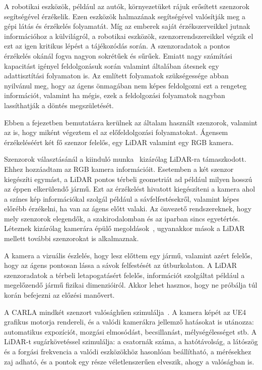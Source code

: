 \documentclass[a4paper,12pt,oneside]{article}
\begin{document}
A robotikai eszközök, például az autók, környezetüket rájuk erősített szenzorok segítségével érzékelik.
Ezen eszközök halmazának segítségével valósítják meg a gépi látás és érzékelés folyamatát. 
Míg az emberek saját 
érzékszerveikkel jutnak információhoz a külvilágról, a robotikai eszközök, 
szenzorrendszereikkel végzik el
ezt az igen kritikus lépést a tájékozódás során. A szenzoradatok a pontos 
érzékelés okánál fogva nagyon sokrétűek 
és sűrűek. Emiatt nagy számítási kapacitást igényel feldolgozásuk során valamint
általában átesnek egy adattisztítási
folyamaton is. Az említett folyamatok szükségessége abban nyilvánul meg, hogy az ágens 
önmagában nem képes feldolgozni ezt a 
rengeteg információt, valamint ha mégis, ezek a feldolgozási folyamatok nagyban 
lassíthatják a döntés megszületését.

Ebben a fejezetben bemutatásra kerülnek az általam használt szenzorok, valamint az is, hogy miként végeztem el az előfeldolgozási
folyamatokat. Ágensem érzékeléséért két fő szenzor felelős, egy LiDAR valamint egy RGB kamera. 

Szenzorok választásánál a kiinduló munka~\cite{terapaptommakol2022obstacle} kizárólag LiDAR-ra támaszkodott.
Ehhez hozzáadtam az RGB kamera információit. Esetemben a két szenzor kiegészíti egymást, a LiDAR pontos
térbeli geometriát ad például milyen hosszú az éppen elkerülendő jármű. 
Ezt az érzékelést hivatott kiegészíteni a kamera ahol a színes kép információkal szolgál például a 
sávfelfestésekről, valamint képes előrébb érzékelni, ha van az ágens előtt valaki.
Az önvezető rendszereknek, hogy mely szenzorok elegendők, a szakirodalomban és az iparban sincs
egyetértés. Léteznek kizárólag kamerára épülő megoldások~\cite{bojarski2016end}, ugyanakkor mások a LiDAR
mellett további szenzorokat is alkalmaznak.

A kamera a vizuális észlelés, hogy lesz előttem
egy jármű, valamint azért felelős, hogy az ágens pontosan lássa a sávok felfestését az útburkolaton. A LiDAR szenzoradatok a térbeli
letapogatásért felelős, információt szolgáltat például a megelőzendő jármű fizikai dimenzióiról. Akkor lehet hasznos, hogy ne próbálja
túl korán befejezni az előzési manővert.

A CARLA mindkét szenzort valósághűen szimulálja~\cite{carladocs}. A kamera
képét az UE4 grafikus motorja rendereli, és a valódi kamerákra
jellemző hatásokat is utánozza: automatikus expozíciót, mozgási elmosódást,
becsillanást, mélységélességet stb. A LiDAR-t sugárkövetéssel szimulálja: 
a csatornák száma, a hatótávolság, a látószög és
a forgási frekvencia a valódi eszközökhöz hasonlóan beállítható, a mérésekhez
zaj adható, és a pontok egy része véletlenszerűen elveszik, ahogy a
valóságban is. 
\end{document}

